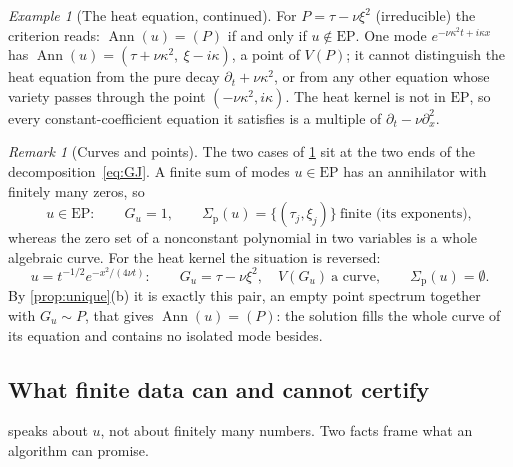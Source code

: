 \documentclass[11pt]{article}
\theoremstyle{plain}
\theoremstyle{definition}
\theoremstyle{remark}
\newtheorem{remark}[theorem]{Remark}
\newtheorem{example}[theorem]{Example}
\DeclareMathOperator{\Ann}{Ann}             %
\newcommand{\Var}{V}                        %
\newcommand{\EP}{\mathrm{EP}}               %
\newcommand{\Gu}{G_u}                       %
\newcommand{\sigp}{\Sigma_{\mathrm p}}      %
\newcommand{\lab}[1]{\textsf{#1}}           %
\newcommand{\FC}{\lab{FIT-COMPATIBLE}}
\newcommand{\roleinalg}[1]{\par\noindent\emph{Role in the algorithm.} #1\par}
\renewcommand{\roleinalg}[1]{}
\begin{document}
\begin{example}[The heat equation, continued]\label{ex:heat-ident}
For $P=\tau-\nu\xi^2$ (irreducible) the criterion reads: $\Ann(u)=(P)$ if and only if $u\notin\EP$.
One mode $e^{-\nu\kappa^2t+i\kappa x}$ has $\Ann(u)=(\tau+\nu\kappa^2,\ \xi-i\kappa)$, a point of
$\Var(P)$; it cannot distinguish the heat equation from the pure decay $\partial_t+\nu\kappa^2$, or from
any other equation whose variety passes through the point $(-\nu\kappa^2,i\kappa)$. The heat kernel is not in $\EP$, so every
constant-coefficient equation it satisfies is a multiple of $\partial_t-\nu\partial_x^2$.
\end{example}

\begin{remark}[Curves and points]\label{rem:curves-points}
The two cases of \cref{ex:heat-ident} sit at the two ends of the decomposition~\eqref{eq:GJ}. A finite sum of modes
$u\in\EP$ has an annihilator with finitely many zeros, so
\[
  u\in\EP:\qquad \Gu=1,\qquad \sigp(u)=\{(\tau_j,\xi_j)\}\ \text{finite (its exponents)},
\]
whereas the zero set of a nonconstant polynomial in two variables is a whole algebraic curve. For the heat kernel
the situation is reversed:
\[
  u=t^{-1/2}e^{-x^2/(4\nu t)}:\qquad \Gu=\tau-\nu\xi^2,\quad \Var(\Gu)\ \text{a curve},\qquad \sigp(u)=\emptyset .
\]
By \cref{prop:unique}(b) it is exactly this pair, an empty point spectrum together with $\Gu\sim P$, that gives
$\Ann(u)=(P)$: the solution fills the whole curve of its equation and contains no isolated mode besides.
\end{remark}

\roleinalg{Data never contain the heat kernel, they contain finitely many sampled modes; a finite
set of modes is always an exponential-polynomial. The algorithm therefore never claims that an
equation is \emph{identified}. It asks whether the modes it sees are \emph{compatible} with a factored
symbol and are rich enough in each factor (enough distinct wavenumbers per branch) for the factor to
be pinned down within its class. This is the meaning of the label \FC{} in the companion algorithm paper.}

\subsection{What finite data can and cannot certify}\label{sec:certify}\label{ch:data}
 speaks about $u$, not about finitely many numbers. Two facts frame what an algorithm
can promise.
\end{document}
